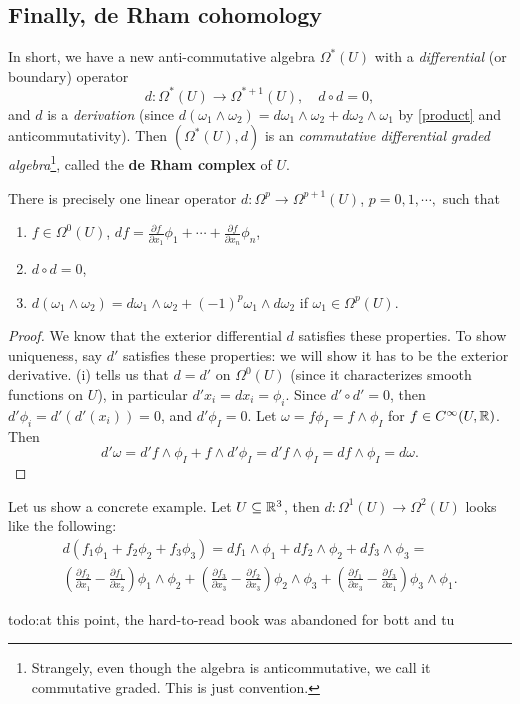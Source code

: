 \subsection{Finally, de Rham cohomology}
In short, we have a new anti-commutative algebra $\Omega^*(U)$ with a \emph{differential} (or boundary) operator \[
    d \colon \Omega^*(U) \to \Omega ^{*+1}(U),\quad d\circ d=0,
\] and $d$ is a \emph{derivation} (since $d(\omega_1\wedge \omega_2)=d\omega_1\wedge \omega_2+d\omega_2\wedge \omega_1$ by \cref{product} and anticommutativity). Then $(\Omega^*(U),d)$ is an \emph{commutative differential graded algebra}\footnote{Strangely, even though the algebra is anticommutative, we call it commutative graded. This is just convention.}, called the \textbf{de Rham complex} of $U$.

\begin{theorem}
    There is precisely one linear operator $d \colon \Omega^p \to \Omega^{p+1}(U)$, $p=0,1,\cdots ,$ such that 
    \begin{enumerate}[label=(\roman*)]
        \setlength\itemsep{-.2em}
    \item $f \in \Omega^0(U)$, $df=\frac{\partial f}{\partial x_1}\phi_1+ \cdots + \frac{\partial f}{\partial x_n }\phi_n $,
    \item $d \circ d=0$,
    \item $d(\omega_1\wedge \omega_2)=d\omega_1\wedge \omega_2+(-1)^p\omega_1\wedge d\omega_2$ if $\omega_1 \in \Omega^p(U)$.
    \end{enumerate}
\end{theorem}
\begin{proof}
    We know that the exterior differential $d$ satisfies these properties. To show uniqueness, say $d'$ satisfies these properties: we will show it has to be the exterior derivative. (i) tells us that $d=d'$ on $\Omega^0(U)$ (since it characterizes smooth functions on $U$), in particular $d'x_i =dx_i =\phi_i $. Since $d' \circ d'=0$, then $d'\phi_i=d'(d'(x_i ))=0 $, and $d' \phi_I=0$. Let $\omega=f \phi_I=f\wedge \phi_I$ for $f \in C^{\infty}(U,\mathbb{R})$. Then \[
    d' \omega=d' f\wedge \phi_I+f\wedge d'\phi_I=d'f\wedge \phi_I=df\wedge \phi_I=d\omega.
    \] 
\end{proof}
\begin{example}
    Let us show a concrete example. Let $U \subseteq \mathbb{R}^3$, then $d \colon \Omega^1 (U) \to \Omega^2(U)$ looks like the following:
    \begin{gather*}
        d(f_1\phi_1+f_2\phi_2+f_3\phi_3)=df_1\wedge \phi_1+df_2\wedge \phi_2+df_3\wedge \phi_3=\\
        \left( \frac{\partial f_2}{\partial x_1}-\frac{\partial f_1}{\partial x_2} \right) \phi_1\wedge \phi_2+\left( \frac{\partial f_3}{\partial x_3}-\frac{\partial f_2}{\partial x_3} \right) \phi_2\wedge \phi_3+\left( \frac{\partial f_1}{\partial x_3}-\frac{\partial f_3}{\partial x_1} \right) \phi_3\wedge \phi_1.
    \end{gather*}
\end{example}
{\color{red}todo:at this point, the hard-to-read book was abandoned for bott and tu} 
